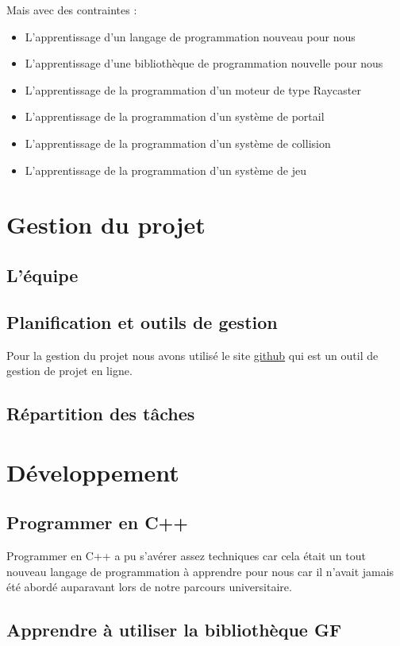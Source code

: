 \documentclass[12pt]{report}
\begin{document}
Mais avec des contraintes :
\begin{itemize}
	\item L'apprentissage d'un langage de programmation nouveau pour nous
	\item L'apprentissage d'une bibliothèque de programmation nouvelle pour nous
	\item L'apprentissage de la programmation d'un moteur de type Raycaster
	\item L'apprentissage de la programmation d'un système de portail
	\item L'apprentissage de la programmation d'un système de collision
	\item L'apprentissage de la programmation d'un système de jeu
\end{itemize}

\section{Gestion du projet}
\subsection{L'équipe}
\subsection{Planification et outils de gestion}

Pour la gestion du projet nous avons utilisé le site 
\href{https://github.com/}{github} qui est un outil de gestion 
de projet en ligne.

\subsection{Répartition des tâches}

\section{Développement}
\subsection{Programmer en C++}

Programmer en C++ a pu s'avérer assez techniques car cela était un tout nouveau
langage de programmation à apprendre pour nous car il n'avait jamais été abordé
auparavant lors de notre parcours universitaire.

\subsection{Apprendre à utiliser la bibliothèque GF}
\end{document}
